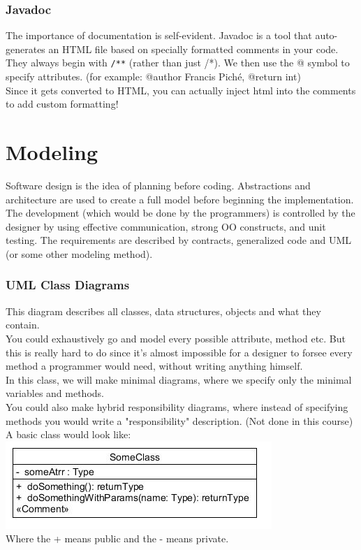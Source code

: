 \documentclass[12pt]{article}
\theoremstyle{definition}
\begin{document}
\section{Javadoc}
The importance of documentation is self-evident. Javadoc is a tool that auto-generates an HTML file based on specially formatted comments in your code. They always begin with \texttt{/**} (rather than just /*). We then use the @ symbol to specify attributes. (for example: @author Francis Pich\'e, @return int) 
\\ \linebreak
Since it gets converted to HTML, you can actually inject html into the comments to add custom formatting!

\part{Modeling}

Software design is the idea of planning before coding. Abstractions and architecture are used to create a full model before beginning the implementation.
\\ \linebreak
The development (which would be done by the programmers) is controlled by the designer by using effective communication, strong OO constructs, and unit testing. The requirements are described by contracts, generalized code and UML (or some other modeling method). 
\\ \linebreak

\section{UML Class Diagrams}
This diagram describes all classes, data structures, objects and what they contain. 
\\ \linebreak
You could exhaustively go and model every possible attribute, method etc. But this is really hard to do since it's almost impossible for a designer to forsee every method a programmer would need, without writing anything himself. 
\\ \linebreak
In this class, we will make minimal diagrams, where we specify only the minimal variables and methods.
\\ \linebreak
You could also make hybrid responsibility diagrams, where instead of specifying methods you would write a "responsibility" description. (Not done in this course)
\\ \linebreak
A basic class would look like:
\\
\includegraphics{basic_class}
\\
Where the + means public and the - means private.
\\ \linebreak
\end{document}
